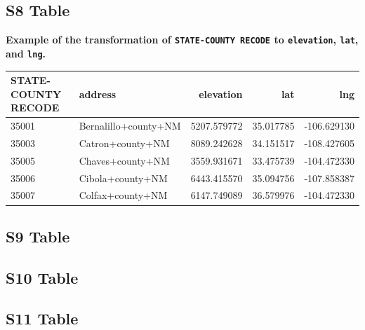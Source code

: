 \documentclass[10pt,letterpaper]{article}
\newcommand{\codewhite}[1]{\colorbox{white}{\texttt{#1}}}
\begin{document}
\subsection*{S8 Table}
\label{S8_Table}
{\bf Example of the transformation of \codewhite{STATE-COUNTY RECODE} to \codewhite{elevation}, \codewhite{lat}, and \codewhite{lng}.}
\begin{table}[H]
\begin{adjustwidth}{-2.25in}{0in} %
\begin{tabular}{llrrr}
\toprule
 STATE-COUNTY RECODE &               address &    elevation &        lat &         lng \\
\midrule
35001 &  Bernalillo+county+NM &  5207.579772 &  35.017785 & -106.629130 \\
35003 &      Catron+county+NM &  8089.242628 &  34.151517 & -108.427605 \\
35005 &      Chaves+county+NM &  3559.931671 &  33.475739 & -104.472330 \\
35006 &      Cibola+county+NM &  6443.415570 &  35.094756 & -107.858387 \\
35007 &      Colfax+county+NM &  6147.749089 &  36.579976 & -104.472330 \\
\bottomrule
\end{tabular}
\end{adjustwidth}
\end{table}



\subsection*{S9 Table}
\label{S9_Table}




\subsection*{S10 Table}
\label{S10_Table}



\subsection*{S11 Table}
\label{S11_Table}
\end{document}
